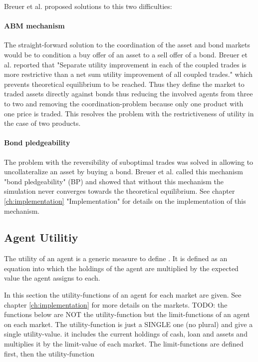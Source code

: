 \documentclass[../Bachelorarbeit.tex]{subfiles}
\begin{document}
Breuer et al. proposed solutions to this two difficulties:
\paragraph{ABM mechanism}
The straight-forward solution to the coordination of the asset and bond markets would be to condition a buy offer of an asset to a sell offer of a bond. Breuer et al. reported that "Separate utility improvement in each of the coupled trades is more restrictive than a net sum utility improvement of all coupled trades." which prevents theoretical equilibrium to be reached. Thus they define the market to traded assets directly against bonds thus reducing the involved agents from three to two and removing the coordination-problem because only one product with one price is traded. This resolves the problem with the restrictiveness of utility in the case of two products.

\paragraph{Bond pledgeability}
The problem with the reversibility of suboptimal trades was solved in allowing to uncollateralize an asset by buying a bond. Breuer et al. called this mechanism "bond pledgeability" (BP) and showed that without this mechanism the simulation never converges towards the theoretical equilibrium. See chapter \ref{ch:implementation} "Implementation" for details on the implementation of this mechanism.

\subsection{Agent Utilitiy}
\label{sec:AGENT_UTILITY}

The utility of an agent is a generic measure to define .
It is defined as an equation into which the holdings of the agent are multiplied by the expected value the agent assigns to each.

In this section the utility-functions of an agent for each market are given. See chapter \ref{ch:implementation} for more details on the markets. TODO: the functions below are NOT the utility-function but the limit-functions of an agent on each market. The utility-function is just a SINGLE one (no plural) and give a single utility-value. it includes the current holdings of cash, loan and assets and multiplies it by the limit-value of each market. The limit-functions are defined first, then the utility-function
\end{document}
